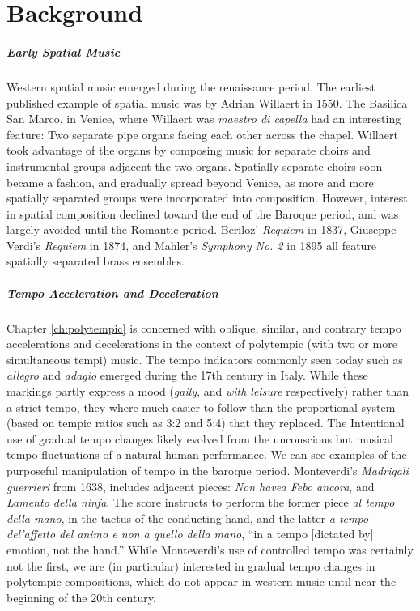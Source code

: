\clearpage
\chapter{Background}
\label{ch:background}

\paragraph{Early Spatial Music} Western spatial music emerged during
the renaissance period. The earliest published example of spatial
music was by Adrian Willaert in 1550.\cite{Zvonar1999c} The Basilica
San Marco, in Venice, where Willaert was \textit{maestro di capella}
had an interesting feature: Two separate pipe organs facing each other
across the chapel. Willaert took advantage of the organs by composing
music for separate choirs and instrumental groups adjacent the two
organs. Spatially separate choirs soon became a fashion, and gradually
spread beyond Venice, as more and more spatially separated groups were
incorporated into composition. However, interest in spatial
composition declined toward the end of the Baroque period, and was
largely avoided until the Romantic period. Beriloz' \textit{Requiem}
in 1837, Giuseppe Verdi's \textit{Requiem} in 1874, and Mahler's
\textit{Symphony No. 2} in 1895 all feature spatially separated brass
ensembles.

\paragraph{Tempo Acceleration and Deceleration}
Chapter \ref{ch:polytempic}   is concerned with oblique, similar, and contrary
tempo accelerations and decelerations in the context of polytempic
(with two or more simultaneous tempi) music.  The tempo indicators
commonly seen today such as \textit{allegro} and \textit{adagio} emerged
during the 17th century in Italy. While these markings partly express
a mood (\textit{gaily}, and \textit{with leisure} respectively) rather
than a strict tempo, they where much easier to follow than the
proportional system (based on tempic ratios such as 3:2 and 5:4) that
they replaced.\cite{Sachs1953} The Intentional use of gradual tempo
changes likely evolved from the unconscious but musical tempo
fluctuations of a natural human performance. We can see examples of
the purposeful manipulation of tempo in the baroque
period. Monteverdi's \textit{Madrigali guerrieri} from 1638, includes
adjacent pieces: \textit{Non havea Febo ancora}, and \textit{Lamento
  della ninfa}. The score instructs to perform the former piece
\textit{al tempo della mano}, in the tactus of the conducting hand,
and the latter \textit{a tempo del'affetto del animo e non a quello
  della mano}, ``in a tempo [dictated by] emotion, not the hand.''
While Monteverdi's use of controlled tempo was certainly not the
first, we are (in particular) interested in gradual tempo changes in
polytempic compositions, which do not appear in western music until
near the beginning of the 20th century.

